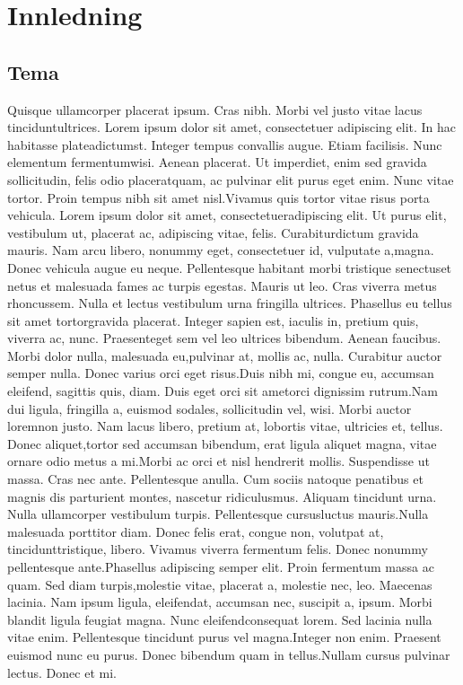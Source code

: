 \section{Innledning}

\subsection{Tema}

Quisque  ullamcorper  placerat  ipsum.  Cras  nibh.  Morbi  vel  justo  vitae  lacus  tinciduntultrices. Lorem ipsum dolor sit amet, consectetuer adipiscing elit. In hac habitasse plateadictumst.  Integer  tempus  convallis  augue.  Etiam  facilisis.  Nunc  elementum  fermentumwisi.  Aenean  placerat.  Ut  imperdiet,  enim  sed  gravida  sollicitudin,  felis  odio  placeratquam, ac pulvinar elit purus eget enim. Nunc vitae tortor. Proin tempus nibh sit amet nisl.Vivamus quis tortor vitae risus porta vehicula. Lorem ipsum dolor sit amet, consectetueradipiscing elit. Ut purus elit, vestibulum ut, placerat ac, adipiscing vitae, felis. Curabiturdictum gravida mauris. Nam arcu libero, nonummy eget, consectetuer id, vulputate a,magna. Donec vehicula augue eu neque. Pellentesque habitant morbi tristique senectuset netus et malesuada fames ac turpis egestas. Mauris ut leo. Cras viverra metus rhoncussem. Nulla et lectus vestibulum urna fringilla ultrices. Phasellus eu tellus sit amet tortorgravida placerat. Integer sapien est, iaculis in, pretium quis, viverra ac, nunc. Praesenteget sem vel leo ultrices bibendum. Aenean faucibus. Morbi dolor nulla, malesuada eu,pulvinar at, mollis ac, nulla. Curabitur auctor semper nulla. Donec varius orci eget risus.Duis nibh mi, congue eu, accumsan eleifend, sagittis quis, diam. Duis eget orci sit ametorci dignissim rutrum.Nam  dui  ligula,  fringilla  a,  euismod  sodales,  sollicitudin  vel,  wisi.  Morbi  auctor  loremnon justo. Nam lacus libero, pretium at, lobortis vitae, ultricies et, tellus. Donec aliquet,tortor sed accumsan bibendum, erat ligula aliquet magna, vitae ornare odio metus a mi.Morbi ac orci et nisl hendrerit mollis. Suspendisse ut massa. Cras nec ante. Pellentesque anulla. Cum sociis natoque penatibus et magnis dis parturient montes, nascetur ridiculusmus. Aliquam tincidunt urna. Nulla ullamcorper vestibulum turpis. Pellentesque cursusluctus mauris.Nulla  malesuada  porttitor  diam.  Donec  felis  erat,  congue  non,  volutpat  at,  tincidunttristique,  libero.  Vivamus  viverra  fermentum  felis.  Donec  nonummy  pellentesque  ante.Phasellus  adipiscing  semper  elit.  Proin  fermentum  massa  ac  quam.  Sed  diam  turpis,molestie vitae, placerat a, molestie nec, leo. Maecenas lacinia. Nam ipsum ligula, eleifendat, accumsan nec, suscipit a, ipsum. Morbi blandit ligula feugiat magna. Nunc eleifendconsequat lorem. Sed lacinia nulla vitae enim. Pellentesque tincidunt purus vel magna.Integer  non  enim.  Praesent  euismod  nunc  eu  purus.  Donec  bibendum  quam  in  tellus.Nullam cursus pulvinar lectus. Donec et mi. 